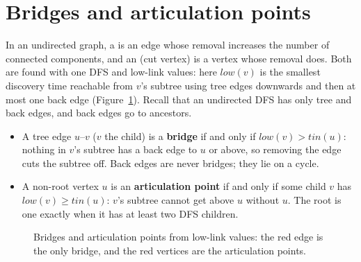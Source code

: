 \section[Bridges and articulation points]{Bridges and articulation points \hfill \plat}\label{sec:bridges}

In an undirected graph, a  is an edge whose removal increases the number of connected components, and an
 (cut vertex) is a vertex whose removal does. Both are found with one DFS and low-link values: here
$\mathit{low}(v)$ is the smallest discovery time reachable from $v$'s subtree using tree edges downwards and then at most one back
edge (Figure~\ref{fig:bridges}). Recall that an undirected DFS has only tree and back edges, and back edges go to ancestors.

\begin{itemize}
  \item A tree edge $u$--$v$ ($v$ the child) is a \textbf{bridge} if and only if $\mathit{low}(v) > \mathit{tin}(u)$: nothing in
        $v$'s subtree has a back edge to $u$ or above, so removing the edge cuts the subtree off. Back edges are never bridges;
        they lie on a cycle.
  \item A non-root vertex $u$ is an \textbf{articulation point} if and only if some child $v$ has $\mathit{low}(v) \ge
        \mathit{tin}(u)$: $v$'s subtree cannot get above $u$ without $u$. The root is one exactly when it has at least two DFS
        children.
\end{itemize}

\begin{figure}[htbp]
\centering
{}
\caption{Bridges and articulation points from low-link values: the red edge is the only bridge, and the red vertices are the
articulation points.}
\label{fig:bridges}
\end{figure}

